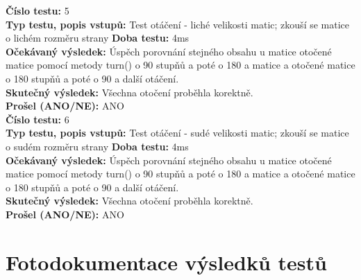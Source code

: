 \documentclass[a4paper,12pt]{article}
\begin{document}
     \textbf{Číslo testu:} 5\\
     \textbf{Typ testu, popis vstupů:} Test otáčení - liché velikosti matic; zkouší se matice o lichém rozměru strany
     \textbf{Doba testu:} 4ms \\
     \textbf{Očekávaný výsledek:} Úspěch porovnání stejného obsahu u matice otočené matice pomocí metody turn()
     o 90 stupňů a poté o 180 a matice a otočené matice o 180 stupňů a poté o 90 a další otáčení.\\
     \textbf{Skutečný výsledek:} Všechna otočení proběhla korektně.\\
     \textbf{Prošel (ANO/NE):} ANO\\

     \textbf{Číslo testu:} 6\\
     \textbf{Typ testu, popis vstupů:} Test otáčení - sudé velikosti matic; zkouší se matice o sudém rozměru strany
     \textbf{Doba testu:} 4ms \\
     \textbf{Očekávaný výsledek:} Úspěch porovnání stejného obsahu u matice otočené matice pomocí metody turn()
     o 90 stupňů a poté o 180 a matice a otočené matice o 180 stupňů a poté o 90 a další otáčení.\\
     \textbf{Skutečný výsledek:} Všechna otočení proběhla korektně.\\
     \textbf{Prošel (ANO/NE):} ANO\\
\section{Fotodokumentace výsledků testů}

\end{document}
